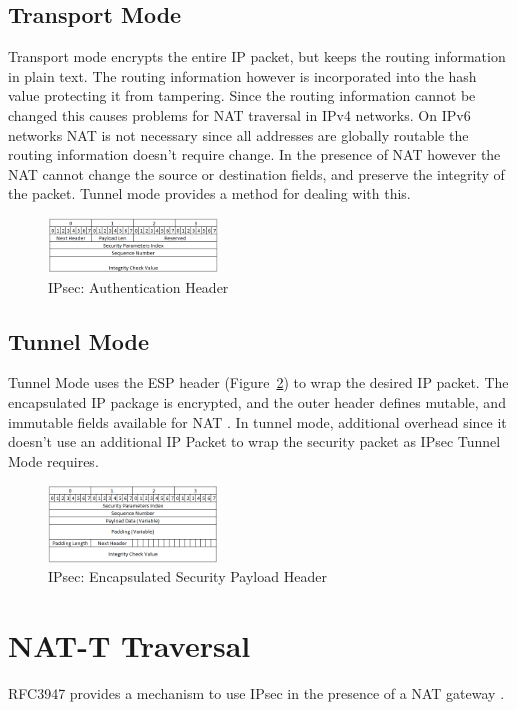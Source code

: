 \documentclass[conference,12pt]{IEEEtran}
\begin{document}
\subsection{Transport Mode}
Transport mode encrypts the entire IP packet, but keeps the routing information
in plain text. The routing information however is incorporated into the hash
value protecting it from tampering. Since the routing information cannot be
changed this causes problems for NAT traversal in IPv4 networks.  On IPv6
networks NAT is not necessary since all addresses are globally routable the
routing information doesn't require change. In the presence of NAT however the
NAT cannot change the source or destination fields, and preserve the integrity
of the packet. Tunnel mode provides a method for dealing with this.

\begin{figure}
\centering
\includegraphics[width=0.4\textwidth]{AH.png}
\caption{IPsec: Authentication Header}
\label{fig:ah}
\end{figure}

\subsection{Tunnel Mode}
Tunnel Mode uses the ESP header (Figure~\ref{fig:esp}) to wrap the desired IP
packet. The encapsulated IP package is encrypted, and the outer header defines
mutable, and immutable fields available for NAT \autocite{rfc4301}.  In tunnel
mode,  additional overhead since it doesn't use an additional IP
Packet to wrap the security packet as IPsec Tunnel Mode requires. 

\begin{figure}
\centering
\includegraphics[width=0.4\textwidth]{ESP.png}
\caption{IPsec: Encapsulated Security Payload Header}
\label{fig:esp}
\end{figure}

\section{NAT-T Traversal}
RFC3947 provides a mechanism to use IPsec in the presence of a NAT gateway
\autocite{rfc3947}.  
\end{document}
